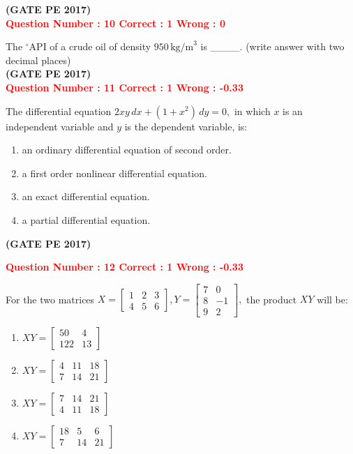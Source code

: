 \documentclass[journal,12pt,onecolumn]{article}
\begin{document}
{\hfill\textbf{(GATE PE 2017)}\\[0.6cm]

\textcolor{red}{\textbf{Question Number : 10 \hfill Correct : 1  Wrong : 0}}

The $^\circ$API of a crude oil of density $950 \, \text{kg/m}^3$ is \_\_\_\_. (write answer with two decimal places)\\

\hfill\textbf{(GATE PE 2017)}\\[0.6cm]

\textcolor{red}{\textbf{Question Number : 11 \hfill Correct : 1  Wrong : -0.33}}

The differential equation 
{\LARGE$
2xy \, dx + (1 + x^2) \, dy = 0,
$}
in which $x$ is an independent variable and $y$ is the dependent variable, is:

\begin{enumerate}[label=(\Alph*)]
    \item an ordinary differential equation of second order.
    \item a first order nonlinear differential equation.
    \item an exact differential equation.
    \item a partial differential equation.
\end{enumerate}
\hfill\textbf{(GATE PE 2017)}\\[0.6cm]

\newpage

\textcolor{red}{\textbf{Question Number : 12 \hfill Correct : 1  Wrong : -0.33}}

For the two matrices 
$ 
X = \begin{bmatrix} 1 & 2 & 3 \\ 4 & 5 & 6 \end{bmatrix}, 
Y = \begin{bmatrix} 7 & 0 \\ 8 & -1 \\ 9 & 2 \end{bmatrix},
$ 
the product $XY$ will be:

\begin{enumerate}[label=(\Alph*)]
    \item $XY = \begin{bmatrix} 50 & 4 \\ 122 & 13 \end{bmatrix}$
    \item $XY = \begin{bmatrix} 4 & 11 & 18 \\ 7 & 14 & 21 \end{bmatrix}$
    \item $XY = \begin{bmatrix} 7 & 14 & 21 \\ 4 & 11 & 18 \end{bmatrix}$
    \item $XY = \begin{bmatrix} 18 & 5 & 6 \\ 7 & 14 & 21 \end{bmatrix}$
\end{enumerate}

}
\end{document}
